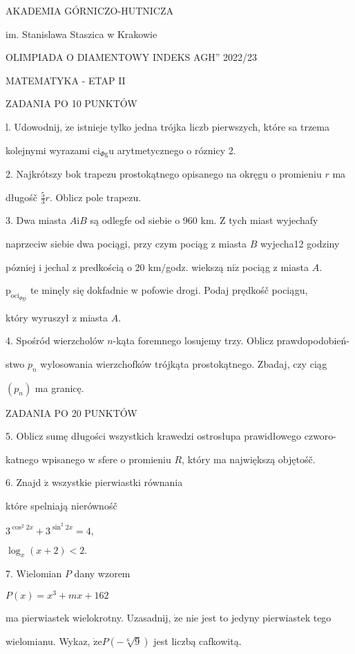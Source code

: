 \documentclass[a4paper,12pt]{article}
\begin{document}
AKADEMIA GÓRNICZO-HUTNICZA

im. Stanislawa Staszica w Krakowie

OLIMPIADA O DIAMENTOWY INDEKS AGH'' 2022/23

MATEMATYKA - ETAP II

ZADANIA PO 10 PUNKTÓW

l. Udowodnij, $\dot{\mathrm{z}}\mathrm{e}$ istnieje tylko jedna trójka liczb pierwszych, które sa trzema

kolejnymi wyrazami $\mathrm{c}\mathrm{i}_{\Phi \mathrm{g}}\mathrm{u}$ arytmetycznego o róznicy 2.

2. Najkrótszy bok trapezu prostokątnego opisanego na okręgu o promieniu $r$ ma

długośč $\displaystyle \frac{5}{3}r$. Oblicz pole trapezu.

3. Dwa miasta $A \mathrm{i} B$ są odlegfe od siebie o 960 km. $\mathrm{Z}$ tych miast wyjechafy

naprzeciw siebie dwa pociągi, przy czym pociąg z miasta $B$ wyjecha12 godziny

póz$\acute{}$niej i jechal z predkością o 20 $\mathrm{k}\mathrm{m}/$godz. wiekszą $\mathrm{n}\mathrm{i}\dot{\mathrm{z}}$ pociąg z miasta $A.$

$\mathrm{p}_{\mathrm{o}\mathrm{c}\mathrm{i}_{\Phi \mathrm{g}\mathrm{i}}}$ te minęly się dokfadnie w pofowie drogi. Podaj prędkośč pociągu,

który wyruszył z miasta $A.$

4. Spośród wierzcholów $n$-kąta foremnego losujemy trzy. Oblicz prawdopodobień-

stwo $p_{n}$ wylosowania wierzchofków trójkąta prostokątnego. Zbadaj, czy ciąg

$(p_{n})$ ma granicę.

ZADANIA PO 20 PUNKTÓW

5. Oblicz sumę długości wszystkich krawedzi ostrosłupa prawidłowego czworo-

katnego wpisanego w sfere o promieniu $R$, który ma największą objętośč.

6. Znajd $\acute{\mathrm{z}}$ wszystkie pierwiastki równania

które spelniają nierównośč

$3^{\cos^{2}2x}+3^{\sin^{2}2x}=4,$

$\log_{x}(x+2)<2.$

7. Wielomian $P$ dany wzorem

$P(x)=x^{3}+mx+162$

ma pierwiastek wielokrotny. Uzasadnij, $\dot{\mathrm{z}}\mathrm{e}$ nie jest to jedyny pierwiastek tego

wielomianu. Wykaz, $\dot{\mathrm{z}}\mathrm{e}P(-\sqrt[6]{9})$ jest liczbą cafkowitą.
\end{document}
